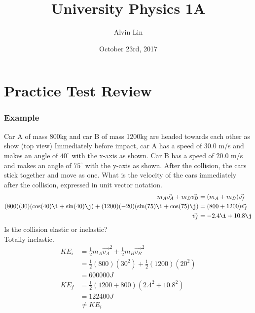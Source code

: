 \documentclass{math}
\title{University Physics 1A}
\author{Alvin Lin}
\date{October 23rd, 2017}
\begin{document}
\maketitle

\section*{Practice Test Review}

\subsubsection*{Example}
Car A of mass 800kg and car B of mass 1200kg are headed towards each other as
show (top view) Immediately before impact, car A has a speed of 30.0 m/s and
makes an angle of \( 40^{\circ} \) with the x-axis as shown. Car B has a speed
of 20.0 m/s and makes an angle of \( 75^{\circ} \) with the y-axis as shown.
After the collision, the cars stick together and move as one. What is the
velocity of the cars immediately after the collision, expressed in unit vector
notation.
\begin{align*}
  m_A\vec{v_A}+m_B\vec{v_B} &= (m_A+m_B)\vec{v_f} \\
  (800)(30)(\cos(40)\i+\sin(40)\j)+(1200)(-20)(\sin(75)\i+\cos(75)\j) &=
    (800+1200)\vec{v_f} \\
  \vec{v_f} &= -2.4\i+10.8\j
\end{align*}
Is the collision elastic or inelastic? \\
Totally inelastic.
\begin{align*}
  KE_i &= \frac{1}{2}m_A\vec{v_A}^2+\frac{1}{2}m_B\vec{v_B}^2 \\
  &= \frac{1}{2}(800)(30^2)+\frac{1}{2}(1200)(20^2) \\
  &= 600000J \\
  KE_f &= \frac{1}{2}(1200+800)(2.4^2+10.8^2) \\
  &= 122400J \\
  &\ne KE_i
\end{align*}
\end{document}
